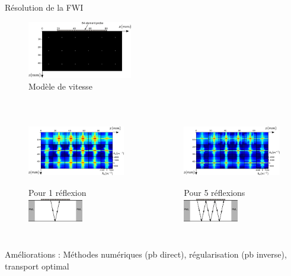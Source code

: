 \begin{frame}{Résolution de la FWI}
	\begin{figure}
		\includegraphics[height=2.5cm]{img/vp_scat.png}\\
		\vspace{-0.3cm} \small{Modèle de vitesse}
	\end{figure}
	\vspace{-0.6cm} 
	\begin{columns}
		\begin{figure}
			\includegraphics[height=3cm]{img/1400pt.png}\\
			\small{Pour 1 réflexion}\\[0.3cm]
			\includegraphics[height=1cm]{img/1ref.png}
		\end{figure}
		\begin{figure}
			\includegraphics[height=3cm]{img/4200pt.png}\\
			\small{Pour 5 réflexions}\\[0.3cm]
			\includegraphics[height=1cm]{img/6ref.png}
		\end{figure}
	\end{columns}

\end{frame}



\begin{frame}
	Améliorations : 
	Méthodes numériques (pb direct), régularisation (pb inverse), transport optimal
\end{frame}